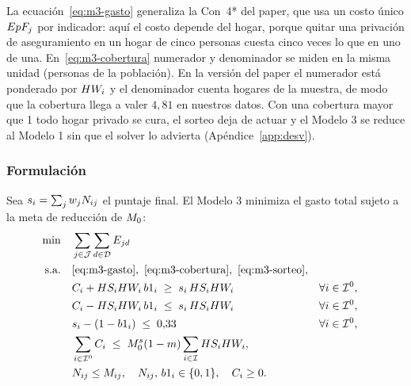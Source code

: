 La ecuación~\eqref{eq:m3-gasto} generaliza la Con~4* del paper, que usa un costo
único $EpF_j$ por indicador: aquí el costo depende del hogar, porque quitar una
privación de aseguramiento en un hogar de cinco personas cuesta cinco veces lo que
en uno de una. En~\eqref{eq:m3-cobertura} numerador y denominador se miden en la
misma unidad (personas de la población). En la versión del paper el numerador
está ponderado por $HW_i$ y el denominador cuenta hogares de la muestra, de
modo que la cobertura llega a valer $4{,}81$ en nuestros datos. Con una
cobertura mayor que 1 todo hogar privado se cura, el sorteo deja de actuar y el
Modelo 3 se reduce al Modelo 1 sin que el solver lo advierta
(Apéndice~\ref{app:desv}).

\subsubsection{Formulación}

Sea $s_i=\sum_j w_jN_{ij}$ el puntaje final. El Modelo 3 minimiza el gasto
total sujeto a la meta de reducción de $M_0$:
\begin{align}
\min\quad & \sum_{j\in\Ind}\sum_{d\in\Zon}\Esf_{jd} \label{eq:m3-obj}\\
\text{s.a.}\quad
& \eqref{eq:m3-gasto},\ \eqref{eq:m3-cobertura},\ \eqref{eq:m3-sorteo}, \notag\\
& \Cont_i + \HS_i\HW_i\, b1_i \;\ge\; s_i\,\HS_i\HW_i
  && \forall i\in\Hog^0, \label{eq:m3-r4}\\
& \Cont_i - \HS_i\HW_i\, b1_i \;\le\; s_i\,\HS_i\HW_i
  && \forall i\in\Hog^0, \label{eq:m3-r5}\\
& s_i - (1-b1_i) \;\le\; 0{,}33
  && \forall i\in\Hog^0, \label{eq:m3-r6}\\
& \sum_{i\in\Hog^0}\Cont_i \;\le\; \MPIs(1-\MPIr)\sum_{i\in\Hog}\HS_i\HW_i,
  \label{eq:m3-meta}\\
& \Ndec_{ij}\le M_{ij},\quad \Ndec_{ij},\,b1_i\in\{0,1\},\quad \Cont_i\ge 0. \notag
\end{align}

